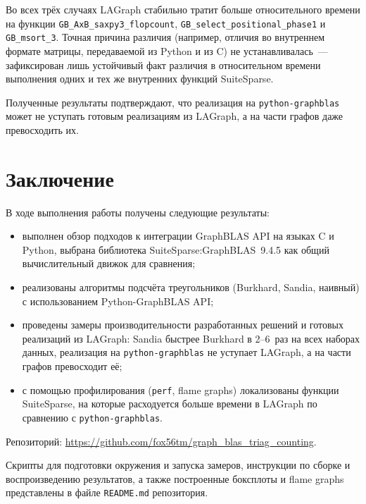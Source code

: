 \documentclass[a4paper]{article}
\begin{document}
Во всех трёх случаях LAGraph стабильно тратит больше относительного времени на функции \texttt{GB\_AxB\_sax\-py3\_flop\-count}, \texttt{GB\_select\_posi\-ti\-o\-nal\_pha\-se1} и \texttt{GB\_msort\_3}.
Точная причина различия (например, отличия во внутреннем формате матрицы, передаваемой из Python и из C) не уста\-нав\-ли\-ва\-лась~--- зафиксирован лишь устойчивый факт различия в относительном времени выполнения одних и тех же внутренних функций SuiteSparse.

Полученные результаты подтверждают, что реализация на \texttt{python-graphblas} может не уступать готовым реализациям из LAGraph, а на части графов даже превосходить их.

\section{Заключение}

В ходе выполнения работы получены следующие результаты:

\begin{itemize}
    \item выполнен обзор подходов к интеграции GraphBLAS API на языках C и Python, выбрана библиотека SuiteSparse:GraphBLAS~9.4.5 как общий вычислительный движок для сравнения;
    \item реализованы алгоритмы подсчёта треугольников (Burkhard, Sandia, наивный) с использованием Python-GraphBLAS API;
    \item проведены замеры производительности разработанных решений и готовых реализаций из LAGraph: Sandia быстрее Burkhard в 2--6~раз на всех наборах данных, реализация на \texttt{python-graphblas} не уступает LAGraph, а на части графов превосходит её;
    \item с помощью профилирования (\texttt{perf}, flame graphs) локализованы функции SuiteSparse, на которые расходуется больше времени в LAGraph по сравнению с \texttt{python-graphblas}.
\end{itemize}

Репозиторий: \url{https://github.com/fox56tm/graph_blas_triag_counting}.

Скрипты для подготовки окружения и запуска замеров, инструкции по сборке и воспроизведению результатов, а также построенные боксплоты и flame graphs представлены в файле \texttt{README.md} репозитория.
\end{document}
